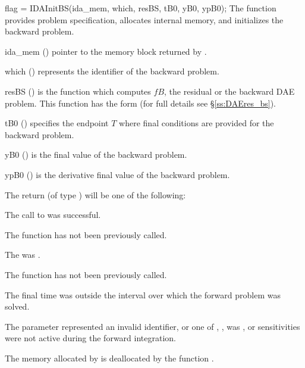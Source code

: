 {
  flag = IDAInitBS(ida\_mem, which, resBS, tB0, yB0, ypB0);
}
{
  The function  provides problem specification, allocates internal memory, 
  and initializes the backward problem.
}
{
  \begin{args}
  \item[ida\_mem] ()
    pointer to the {\idas} memory block returned by .
  \item[which] ()
    represents the identifier of the backward problem.
  \item[resBS] ()
    is the {\C} function which computes $fB$, the residual or the 
    backward DAE problem. This function has the form 
    (for full details see \S\ref{ss:DAEres_bs}).
  \item[tB0] ()
    specifies the endpoint $T$ where final conditions are provided for the 
    backward problem.
  \item[yB0] ()
    is the final value of the backward problem. 
  \item[ypB0] ()
    is the derivative final value of the backward problem. 
  \end{args}
}
{
  The return  (of type ) will be one of the following:
  \begin{args}
  \item[\Id{IDA\_SUCCESS}]
    The call to  was successful.
  \item[\Id{IDA\_NO\_MALLOC}]
    The function  has not been previously called.
  \item[\Id{IDA\_MEM\_NULL}]
    The  was .
  \item[\Id{IDA\_NO\_ADJ}]
    The function  has not been previously called.
  \item[\Id{IDA\_BAD\_TB0}]
    The final time  was outside the interval over which the forward problem
    was solved.
  \item[\Id{IDA\_ILL\_INPUT}]
    The parameter  represented an invalid identifier, or one
    of , ,  was , or sensitivities were not
    active during the forward integration.
  \end{args}
}
{
  The memory allocated by  is deallocated by the function 
  .
  
}

